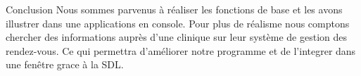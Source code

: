 \documentclass{beamer}
\begin{document}
\begin{frame}{Conclusion}
Nous sommes parvenus à réaliser les fonctions de base et les avons illustrer dans une applications en console. Pour plus de réalisme nous comptons chercher des informations auprès d'une clinique sur leur système de gestion des rendez-vous. Ce qui permettra d'améliorer notre programme et de l'integrer dans une fenêtre grace à la SDL.  \\
\end{frame}
\end{document}
